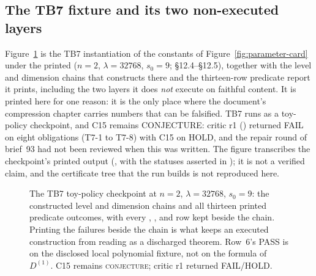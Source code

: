 \normalsize

\subsection{The TB7 fixture and its two non-executed layers}
\label{sec:tb7-card}

Figure~\ref{fig:tb7-card} is the TB7 instantiation of the constants of
Figure~\ref{fig:parameter-card} under the printed 
(\(n=2\), \(\lambda=32768\), \(s_0=9\);  \S12.4--\S12.5),
together with the level and dimension chains that  constructs
there and the thirteen-row predicate report it prints, including the two layers
it does \emph{not} execute on faithful content.  It is printed here for one
reason: it is the only place where the document's compression chapter carries
numbers that can be falsified.  TB7 runs as a toy-policy checkpoint, and C15
remains \textsc{CONJECTURE}: critic r1 () returned
FAIL on eight obligations (T7-1 to T7-8) with C15 on HOLD, and the repair
round of brief~93 had not been reviewed when this was written.  The figure
transcribes the
checkpoint's printed output (, with the
statuses asserted in ); it is not a verified claim,
and the certificate tree that the run builds is not reproduced here.
\begin{figure}[H]
\centering

\caption{The TB7 toy-policy checkpoint at \(n=2\), \(\lambda=32768\), \(s_0=9\): the constructed level and dimension chains and all thirteen printed predicate outcomes, with every , ,  and  row kept beside the chain.  Printing the failures beside the chain is what keeps an executed construction from reading as a discharged theorem.  Row~6's PASS is on the disclosed local polynomial fixture, not on the formula of \(D^{(1)}\).  C15 remains \textsc{conjecture}; critic r1 returned FAIL/HOLD.}
\label{fig:tb7-card}
\end{figure}


